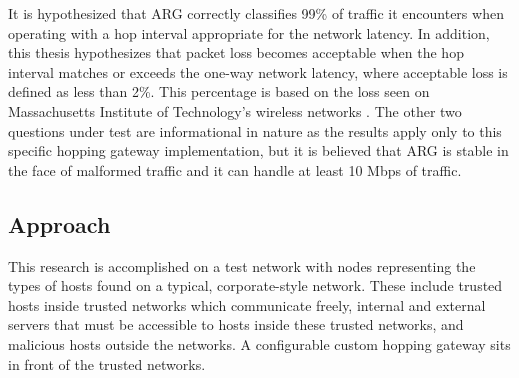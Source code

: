 

\par It is hypothesized that \ac{ARG} correctly classifies 99\% of traffic it encounters when operating with a hop interval appropriate for the network latency. In addition, this thesis hypothesizes that packet loss becomes acceptable when the hop interval matches or exceeds the one-way network latency, where acceptable loss is defined as less than 2\%. This percentage is based on the loss seen on Massachusetts Institute of Technology's wireless networks \cite{MITWifiLoss}. The other two questions under test are informational in nature as the results apply only to this specific hopping gateway implementation, but it is believed that \ac{ARG} is stable in the face of malformed traffic and it can handle at least 10 \ac{Mbps} of traffic. 

\subsection{Approach}
\label{sec:approach}
\par This research is accomplished on a test network with nodes representing the types of hosts found on a typical, corporate-style network. These include trusted hosts inside trusted networks which communicate freely, internal and external servers that must be accessible to hosts inside these trusted networks, and malicious hosts outside the networks. A configurable custom hopping gateway sits in front of the trusted networks. 

